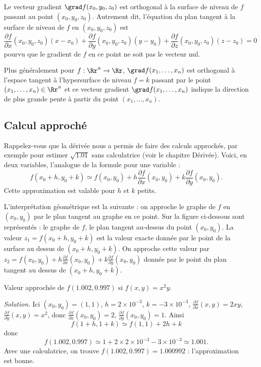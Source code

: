 \begin{proposition}{}{}
	Le vecteur gradient $\grad f(x_0,y_0,z_0)$ est orthogonal à la surface de niveau de $f$ passant au point $(x_0,y_0,z_0)$. Autrement dit,
	l'équation du plan tangent à la surface de niveau de $f$ en $(x_0,y_0,z_0)$ est 
	$$\frac{\partial f}{\partial x}(x_0,y_0,z_0)(x-x_0)
	+\frac{\partial f}{\partial y}(x_0,y_0,z_0)(y-y_0)
	+\frac{\partial f}{\partial z}(x_0,y_0,z_0)(z-z_0)
	= 0 $$
	pourvu que le gradient de $f$ en ce point ne soit pas le vecteur nul.
\end{proposition}




Plus généralement pour $f : \Rr^n \to \Rr$, $\grad f (x_1,\ldots,x_n)$ est orthogonal à l'espace tangent à
l'hypersurface de niveau $f=k$ passant par le point $(x_1,\ldots,x_n)\in\Rr^n$ et 
ce vecteur gradient $\grad f(x_1,\ldots,x_n)$ indique la direction de plus grande pente à partir du point $(x_1,\ldots,x_n)$.



\subsection{Calcul approché}

Rappelez-vous que la dérivée nous a permis de faire des calculs approchés, par exemple pour estimer $\sqrt{1.01}$ sans calculatrice (voir le chapitre \og{}Dérivée\fg{}).
Voici, en deux variables, l'analogue de la formule pour une variable : 
$$f(x_0+h,y_0+k) \simeq f(x_0,y_0) + h\frac{\partial f}{\partial x}(x_0,y_0)
+k\frac{\partial f}{\partial y}(x_0,y_0).$$
Cette approximation est valable pour $h$ et $k$ petits.

L'interprétation géométrique est la suivante : 
on approche le graphe de $f$ en $(x_0,y_0)$ par le plan tangent au graphe en ce point. Sur la figure ci-dessous sont représentés : le graphe de $f$, le plan tangent au-dessus du point $(x_0,y_0)$. La valeur $z_1 = f(x_0+h,y_0+k)$ est la valeur exacte donnée par le point de la surface au dessus de $(x_0+h,y_0+k)$. On approche cette valeur par $z_2 = f(x_0,y_0) + h\frac{\partial f}{\partial x}(x_0,y_0)
+k\frac{\partial f}{\partial y}(x_0,y_0)$ donnée par le point du plan tangent au dessus de $(x_0+h,y_0+k)$. 




\begin{exemple}{}{}
	Valeur approchée de $f(1.002, 0.997)$ si $f(x,y) = x^2y$.
	\bigskip
	
	\emph{Solution.}
	Ici $(x_0,y_0) = (1,1)$, $h = 2 \times 10^{-3}$, $k = -3 \times 10^{-3}$,
	$\frac{\partial f}{\partial x}(x,y) = 2xy$, $\frac{\partial f}{\partial y}(x,y) = x^2$, donc $\frac{\partial f}{\partial x}(x_0,y_0) = 2$, $\frac{\partial f}{\partial y}(x_0,y_0) = 1$. Ainsi
	$$f(1+h,1+k) \simeq f(1,1) + 2h + k$$
	donc 
	$$f(1.002, 0.997) \simeq 1 + 2 \times 2 \times 10^{-3} - 3 \times 10^{-3} \simeq 1.001.$$
	Avec une calculatrice, on trouve $f(1.002, 0.997) = 1.000992$ : l'approximation est bonne.
\end{exemple}


